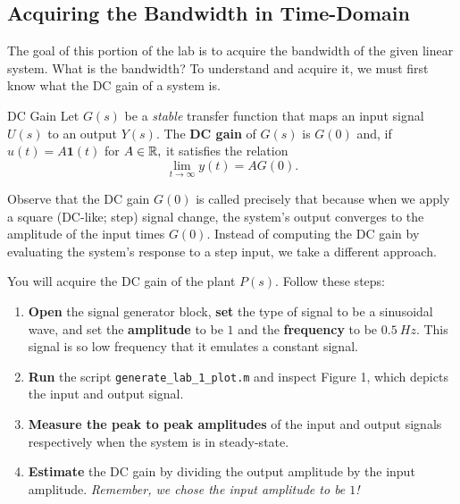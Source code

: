 \subsection{Acquiring the Bandwidth in Time-Domain}
The goal of this portion of the lab is to acquire the bandwidth of the
given linear system. What is the bandwidth? To understand and acquire it,
we must first know what the DC gain of a system is.
%
\begin{definition}[label={def:lab1:dcgain}]{DC Gain}
  Let \(G(s)\) be a \emph{stable} transfer function
  that maps an input signal \(U(s)\) to an
  output \(Y(s).\) The \textbf{DC gain} of \(G(s)\) is \(G(0)\) and,
  if \(u(t) = A \mathbf{1}(t)\) for \(A \in \mathbb{R},\) it satisfies the relation
  \[
    \lim_{t\to \infty} y(t) = A G(0).
  \]
\end{definition}
%
Observe that the DC gain \(G(0)\) is called precisely that because when we
apply a square (DC-like; step) signal change, the system's output converges
to the amplitude of the input times \(G(0).\)
%
Instead of computing the DC gain by evaluating the system's response to a step
input, we take a different approach.
%
\begin{procedure}[label={proc:lab1:p1}]
  You will acquire the DC gain of the plant \(P(s)\). Follow these steps:
  \begin{enumerate}[label=(\arabic*)]
    \item{
      \textbf{Open} the signal generator block, \textbf{set} the type of signal
      to be a sinusoidal wave, and set the
      \textbf{amplitude} to be \(1\) and the \textbf{frequency}
      to be \(\SI{0.5}{Hz}.\) This signal is so low frequency that it
      emulates a constant signal.
    }
    \item{
      \textbf{Run} the script \texttt{generate\_lab\_1\_plot.m} and inspect
      Figure 1, which depicts the input and output signal.
    }
    \item{
      \textbf{Measure the peak to peak amplitudes} of the input and output signals respectively when the system is in steady-state.
    }
    \item{
      \textbf{Estimate} the DC gain by dividing the output amplitude
      by the input amplitude. \emph{Remember, we chose the input amplitude
      to be \(1\)!}
    }
  \end{enumerate}
\end{procedure}
%
